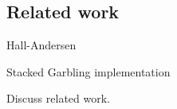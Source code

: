 \subsection{Related work}
\label{sec:related_work}
Hall-Andersen

Stacked Garbling implementation

Discuss related work.


